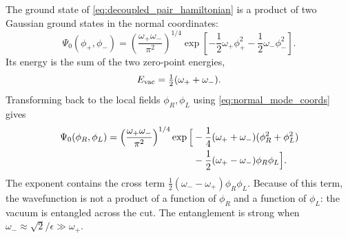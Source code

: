 The ground state of \eqref{eq:decoupled_pair_hamiltonian} is a product of two Gaussian ground states in the
normal coordinates:
\begin{equation}
\Psi_0(\phi_+, \phi_-) = \left( \frac{\omega_+ \omega_-}{\pi^2} \right)^{1/4}
\exp\left[ -\frac{1}{2}\omega_+\phi_+^2 - \frac{1}{2}\omega_-\phi_-^2 \right] .
\label{eq:ground_state_normal}
\end{equation}
Its energy is the sum of the two zero-point energies,
\begin{equation}
E_{\rm vac} = \tfrac12(\omega_+ + \omega_-) .
\label{eq:pair_vacuum_energy}
\end{equation}
Transforming back to the local fields $\phi_R, \phi_L$ using \eqref{eq:normal_mode_coords} gives
\begin{align}
\Psi_0(\phi_R, \phi_L) = \left( \frac{\omega_+ \omega_-}{\pi^2} \right)^{1/4}
\exp\Big[ &-\frac{1}{4}(\omega_+ + \omega_-)(\phi_R^2 + \phi_L^2) \notag\\
&- \frac{1}{2}(\omega_+ - \omega_-)\phi_R \phi_L \Big] .
\label{eq:ground_state_physical}
\end{align}
The exponent contains the cross term $\frac{1}{2}(\omega_- - \omega_+)\phi_R \phi_L$. Because of this term,
the wavefunction is not a product of a function of $\phi_R$ and a function of $\phi_L$: the vacuum is
entangled across the cut. The entanglement is strong when $\omega_- \approx \sqrt{2}/\epsilon \gg \omega_+$.

